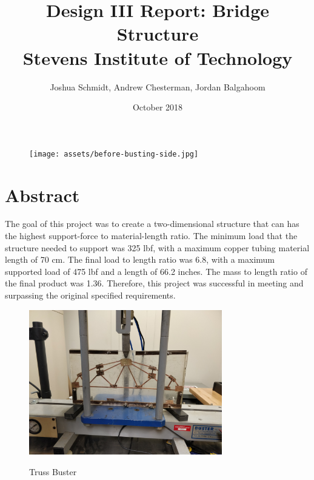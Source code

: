 \documentclass{article}
\title{%
  Design III Report: Bridge Structure \\
	\large Stevens Institute of Technology}
\date{October 2018}
\author{Joshua Schmidt, Andrew Chesterman, Jordan Balgahoom}
\let\Oldsection\section
\renewcommand{\section}{\FloatBarrier\Oldsection}
\begin{document}
\maketitle

\bigskip
\bigskip
\bigskip
\bigskip

\begin{figure}[!htb]
  \centering
  \texttt{[image: assets/before-busting-side.jpg]}
  \label{fig:logo}
\end{figure}

\newpage

\tableofcontents

\newpage


\section{Abstract}

The goal of this project was to create a two-dimensional structure that can has the highest support-force to material-length ratio. The minimum load that the structure needed to support was 325 lbf, with a maximum copper tubing material length of 70 cm. The final load to length ratio was 6.8, with a maximum supported load of 475 lbf and a length of 66.2 inches. The mass to length ratio of the final product was 1.36. Therefore, this project was successful in meeting and surpassing the original specified requirements.

\bigskip
\bigskip
\bigskip
\bigskip
\bigskip
\bigskip
\bigskip
\bigskip

\begin{figure}[!htb]
  \centering
  \includegraphics[width=0.75\textwidth]{assets/in-buster-close.jpg}
  \label{fig:truss-buster}
  \caption{Truss Buster}
\end{figure}
\end{document}
